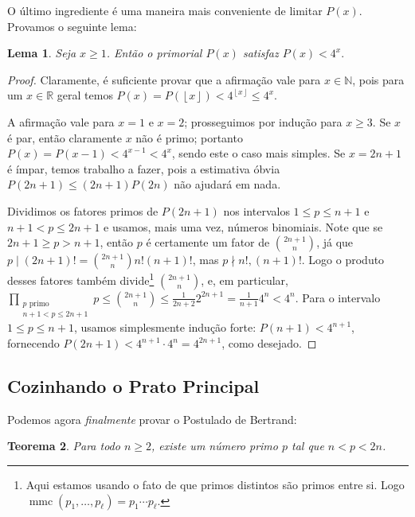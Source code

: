 \documentclass[11pt]{article}
\newtheorem{theorem}{Teorema}[section]
\newtheorem{lemma}[theorem]{Lema}
\theoremstyle{remark}
\newcommand{\floor}[1]{\left\lfloor #1 \right\rfloor}
\newcommand{\vs}{\vspace{10px}}
\begin{document}
O último ingrediente é uma maneira mais conveniente de limitar $P(x)$. Provamos o seguinte lema:
 
\begin{lemma} \label{lemma:bound_primorial}
    Seja $x\ge 1$. Então o primorial $P(x)$ satisfaz $P(x)< 4^{x}.$
\end{lemma}
\begin{proof}
    Claramente, é suficiente provar que a afirmação vale para $x\in\mathbb N$, pois para um $x\in \mathbb R$ geral temos $P(x)=P(\floor x)< 4^{\floor x}\le 4^x$.

    A afirmação vale para $x =1$ e $x =2$; prosseguimos por indução para $x \ge 3$. Se $x$ é par, então claramente $x$ não é primo; portanto $P(x) = P(x-1) < 4^{x-1}<4^x$, sendo este o caso mais simples. Se $x = 2n+1$ é ímpar, temos trabalho a fazer, pois a estimativa óbvia $P(2n+1)\le (2n+1)P(2n)$ não ajudará em nada.
    \vs
    
    Dividimos os fatores primos de $P(2n+1)$ nos intervalos $1\le p\le n+1$ e $n+1< p\le 2n+1$ e usamos, mais uma vez, números binomiais. Note que se $2n+1\ge p>n+1$, então $p$ é certamente um fator de $\binom{2n+1}{n}$, já que $p\mid (2n+1)! = \binom{2n+1}{n}n!(n+1)!$, mas $p\nmid n!, (n+1)!$. Logo o produto desses fatores também divide\footnote{Aqui estamos usando o fato de que primos distintos são primos entre si. Logo $\operatorname{mmc}(p_1,\ldots,p_\ell)=p_1\cdots p_\ell.$} $\binom{2n+1}{n}$, e, em particular, $\prod\limits_{\substack{p\text{ primo} \\ n+1<p\le 2n+1}}p\le \binom{2n+1}{n}\le \frac1{2n+2}2^{2n+1}=\frac1{n+1}4^n<4^n.$ Para o intervalo $1\le p\le n+1$, usamos simplesmente indução forte: $P(n+1)< 4^{n+1}$, fornecendo $P(2n+1)< 4^{n+1}\cdot 4^n= 4^{2n+1}$, como desejado.


\end{proof}
\vs

\subsection{Cozinhando o Prato Principal}

Podemos agora \textit{finalmente} provar o Postulado de Bertrand:

\begin{theorem}
    Para todo $n\ge 2$, existe um número primo $p$ tal que $n<p<2n$.
\end{theorem}
\vs
\end{document}
